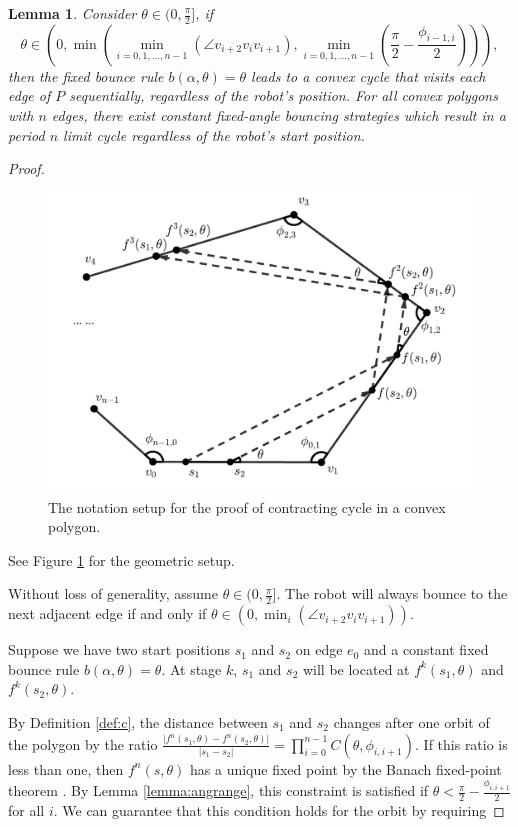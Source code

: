 \documentclass[sageh,times,Review]{sagej}
\newtheorem{lemma}{Lemma}
\begin{document}
\begin{lemma} \label{lem:convex}
Consider $\theta \in (0,\frac{\pi}{2}]$, if 
\begin{equation*}
\theta \in (0, \min(\min_{i = 0, 1, \dots, n-1}(\angle v_{i+2}v_{i}v_{i+1}),
\min_{i = 0, 1, \dots, n-1}(\frac{\pi}{2}-\frac{\phi_{i-1, i}}{2}))),
\end{equation*}
then the fixed bounce rule $b(\alpha, \theta) = \theta$ leads to a convex cycle that visits each edge of $P$ sequentially, regardless of the robot's position.
For all convex polygons with $n$ edges, there exist constant fixed-angle bouncing
strategies which result in a period $n$ limit cycle regardless of the robot's start position.
\end{lemma}
\begin{proof}
\begin{figure}
    \includegraphics[width=0.9\columnwidth]{convex_cycle.pdf}
    \centering
    \caption{The notation setup for the proof of contracting cycle in a convex polygon.\label{fig:conv_cycle}}
    \centering
\end{figure}

See Figure \ref{fig:conv_cycle} for the geometric setup.

Without loss of generality, assume $\theta \in (0, \frac{\pi}{2}]$. The robot will always bounce
to the next adjacent edge if and only if
$\theta \in (0, \min_{i}(\angle v_{i+2}v_{i}v_{i+1}))$.

Suppose we have two start positions $s_1$ and $s_2$ on edge $e_0$ and a constant fixed bounce 
rule $b(\alpha, \theta) = \theta$.
At stage $k$, $s_1$ and $s_2$ will be located at $f^{k}(s_1,\theta)$ and
$f^{k}(s_2,\theta)$. 

By Definition \ref{def:c}, the distance between $s_1$ and $s_2$ changes after one orbit of the polygon by the
ratio $\frac{\lvert f^{n}(s_1, \theta) - f^{n}(s_2, \theta) \rvert}{ \lvert s_1
- s_2 \rvert } = \prod_{i = 0}^{n-1}
C(\theta, \phi_{i, i+1})$. If this ratio is less than one, then $f^n(s,\theta)$ has a unique fixed point by the Banach fixed-point theorem
\cite{Granas2003}. By Lemma \ref{lemma:angrange}, this constraint is satisfied if  
$\theta < \frac{\pi}{2}-\frac{\phi_{i, i+1}}{2}$ for all $i$. We can guarantee that this
condition holds for the orbit by requiring


\end{proof}
\end{document}
